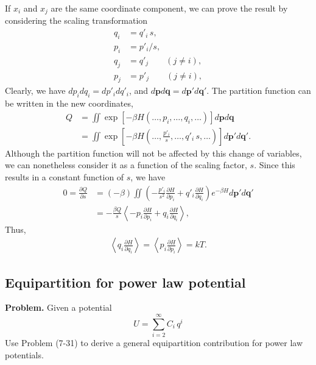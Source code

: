 \documentclass[twocolumn, 10pt]{article}
\numberwithin{equation}{section}
\newenvironment{problem}
{\par\medskip \color{problue}
  \textbf{Problem. }\ignorespaces}
{\medskip}
\begin{document}
If $x_i$ and $x_j$ are the same coordinate component,
we can prove the result by considering the scaling transformation
\begin{align*}
  q_i &= q'_i \, s, \\
  p_i &= p'_i / s, \\
  q_j &= q'_j \qquad (j\ne i), \\
  p_j &= p'_j \qquad (j\ne i),
\end{align*}
Clearly, we have $dp_i dq_i = dp'_i dq'_i$, and
$d\mathbf p d\mathbf q = d\mathbf p' d\mathbf q'$.
%
The partition function can be written in the new coordinates,
%
\begin{align*}
  Q
  &= \iint
  \exp\left[
    -\beta H\left(\dots, p_i, \dots, q_i, \dots\right)
    \right]
  d\mathbf p d\mathbf q
  \\
  &= \iint
  \exp\left[
    -\beta H\left(\dots, \frac{p'_i}{s}, \dots, q'_i\, s, \dots\right)
    \right]
  d\mathbf p' d\mathbf q'.
\end{align*}
%
Although the partition function will not be affected
by this change of variables,
we can nonetheless consider it as a function of
the scaling factor, $s$.
%
Since this results in a constant function of $s$, we have
\begin{align*}
  0=\frac{\partial Q}{\partial s}
  &=
  (-\beta) \iint
  \left(
  -
  \frac{p'_i}{s^2}\frac{\partial H}{\partial p_i}
  +
  q'_i\frac{\partial H}{\partial q_i}
  \right)
  e^{ -\beta H }
  d\mathbf p' d\mathbf q'
  \\
  &=
  -\frac{\beta Q}{s}
  \left\langle
  -
  p_i\frac{\partial H}{\partial p_i}
  +
  q_i\frac{\partial H}{\partial q_i}
  \right\rangle,
\end{align*}
Thus,
\begin{align*}
  \left\langle
    q_i \frac{ \partial H } { \partial q_i }
  \right\rangle
  =
  \left\langle
    p_i \frac{ \partial H } { \partial p_i }
  \right\rangle
  =
  kT
  .
\end{align*}


\subsection{Equipartition for power law potential}

\begin{problem}
  Given a potential
  $$
  U = \sum_{i=2}^\infty C_i \, q^i
  $$
  Use Problem (7-31) to derive a general
  equipartition contribution for power law potentials.
\end{problem}
\end{document}
